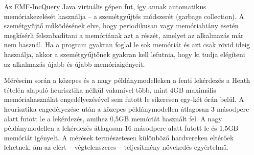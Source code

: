 Az EMF-IncQuery Java virtuális gépen fut, így annak automatikus memóriakezelését használja -- a szemétgyűjtés módszerét (garbage collection).
A szemétgyűjtő működésének elve, hogy periodikusan vagy memóriahiány esetén megkísérli felszabadítani a memóriának azt a részét, amelyet az alkalmazás már nem használ.
Ha a program gyakran foglal le sok memóriát és azt csak rövid ideig használja, akkor a szemétgyűjtőnek gyakran kell lefutnia, hogy ki tudja elégíteni az alkalmazás újabb és újabb memóriaigényeit.
 
Méréseim során a közepes és a nagy példánymodelleken a fenti lekérdezés a Heath tételén alapuló heurisztika nélkül valamivel több, mint 4GB maximális memóriahasználat engedélyezésével sem futott le sikeresen egy-két órán belül.
A heurisztika engedélyezése után a közepes példánymodellen átlagosan 3 másodperc alatt futott le a lekérdezés, amihez 0,5GB memóriát használt fel. A nagy példánymodellen a lekérdezés átlagosan 16 másodperc alatt futott le és 1,5GB memóriát igényelt.
A mérések természetesen különböző hardvereken eltérőek lehetnek, ám az elért -- végtelenszeres -- teljesítmény növekedés egyértelmű.
